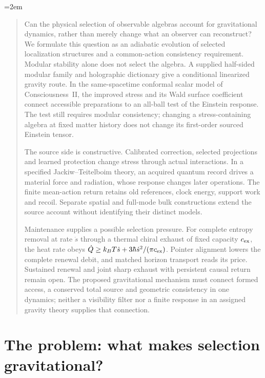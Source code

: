 
\emergencystretch=2em
\raggedbottom
{}

\maketitle


\begin{abstract}
Can the physical selection of observable algebras account for gravitational
dynamics, rather than merely change what an observer can reconstruct?
We formulate this question as an adiabatic evolution of selected localization
structures and a common-action consistency requirement. Modular stability
alone does not select the algebra. A supplied half-sided modular family
and holographic dictionary give a conditional linearized gravity route.
In the same-spacetime conformal scalar model of Consciousness~II, the
improved stress and its Wald surface coefficient connect accessible
preparations to an all-ball test of the Einstein response. The test still
requires modular consistency; changing a stress-containing algebra at
fixed matter history does not change its first-order sourced Einstein tensor.

The source side is constructive. Calibrated correction, selected projections
and learned protection change stress through actual interactions. In a
specified Jackiw--Teitelboim theory, an acquired quantum record drives a
material force and radiation, whose response changes later operations.
The finite mean-action return retains old references, clock energy,
support work and recoil. Separate spatial and full-mode bulk constructions
extend the source account without identifying their distinct models.

Maintenance supplies a possible selection pressure. For complete entropy
removal at rate $\dot s$ through a thermal chiral exhaust of fixed capacity
$c_{\rm ex}$, the heat rate obeys
$\dot Q\ge k_BT\dot s+3\hbar\dot s^2/(\pi c_{\rm ex})$.
Pointer alignment lowers the complete renewal debit, and matched horizon
transport reads its price. Sustained renewal and joint sharp exhaust with
persistent causal return remain open. The proposed gravitational mechanism
must connect formed access, a conserved total source and geometric
consistency in one dynamics; neither a visibility filter nor a finite
response in an assigned gravity theory supplies that connection.
\end{abstract}

\section{The problem: what makes selection gravitational?}
\label{sec:intro}

